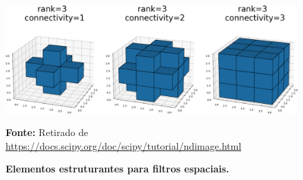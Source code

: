 \documentclass[Portugues]{phdquali}
\begin{document}
\begin{figure}[htb]
  \centering
  \includegraphics[scale=0.3]{images/3D-binary-structure.png}
  \centerline{\scriptsize{\textbf{Fonte:} Retirado de \url{https://docs.scipy.org/doc/scipy/tutorial/ndimage.html}}}
  \caption[Elementos estruturantes para filtros espaciais]{\textbf{Elementos estruturantes para filtros espaciais.}}
  \label{fig:elementos-estruturantes}
\end{figure}
\end{document}
